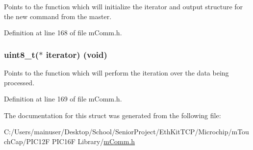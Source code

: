 Points to the function which will initialize the iterator and output structure for the new command from the master. 



Definition at line 168 of file m\+Comm.\+h.

\hypertarget{structm_comm___opcode_a6995b26b309317115ab75caad4adcf1d}{}
\subsubsection[{iterator}]{\setlength{\rightskip}{0pt plus 5cm}uint8\+\_\+t($\ast$ iterator) (void)}\label{structm_comm___opcode_a6995b26b309317115ab75caad4adcf1d}


Points to the function which will perform the iteration over the data being processed. 



Definition at line 169 of file m\+Comm.\+h.



The documentation for this struct was generated from the following file\+:\begin{DoxyCompactItemize}
\item 
C\+:/\+Users/mainuser/\+Desktop/\+School/\+Senior\+Project/\+Eth\+Kit\+T\+C\+P/\+Microchip/m\+Touch\+Cap/\+P\+I\+C12\+F P\+I\+C16\+F Library/\hyperlink{m_comm_8h}{m\+Comm.\+h}\end{DoxyCompactItemize}
